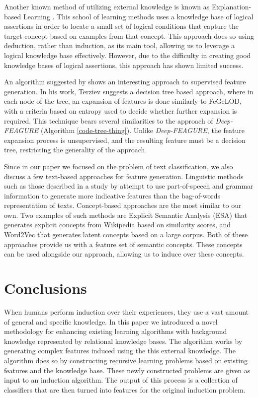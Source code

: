 \documentclass[twoside,11pt]{article}
\theoremstyle{definition}
\begin{document}
Another known method of utilizing external knowledge is known as Explanation-based Learning . This school of learning methods uses a knowledge base of logical assertions in order to locate a small set of logical conditions that capture the target concept based on examples from that concept. This approach does so using deduction, rather than induction, as its main tool, allowing us to leverage a logical knowledge base effectively.
However, due to the difficulty in creating good knowledge bases of logical assertions, this approach has shown limited success.

An algorithm suggested by  shows an interesting approach to supervised feature generation. In his work, Terziev suggests a decision tree based approach, where in each node of the tree, an expansion of features is done similarly to FeGeLOD, with a criteria based on entropy used to decide whether further expansion is required. This technique bears several similarities to the approach of \emph{Deep-FEAGURE} (Algorithm \ref{code-tree-thing}). Unlike \emph{Deep-FEAGURE}, the feature expansion process is unsupervised, and the resulting feature must be a decision tree, restricting the generality of the approach.

Since in our paper we focused on the problem of text classification, we also discuss a few text-based approaches for feature generation. 
Linguistic methods such as those described in a study by  attempt to use part-of-speech and grammar information to generate more indicative features than the bag-of-words representation of texts.
Concept-based approaches are the most similar to our own. Two examples of such methods are Explicit Semantic Analysis (ESA) \cite{gabrilovich2009wikipediafull} that generates explicit concepts from Wikipedia based on similarity scores, and Word2Vec  that generates latent concepts based on a large corpus. Both of these approaches provide us with a feature set of semantic concepts. These concepts can be used alongside our approach, allowing us to induce over these concepts.

\section{Conclusions}

When humans perform induction over their experiences, they use a vast amount of general and specific knowledge. In this paper we introduced a novel methodology for enhancing existing learning algorithms with background knowledge represented by relational knowledge bases.
The algorithm works by generating complex features induced using the this external knowledge. The algorithm does so by constructing recursive learning problems based on existing features and the knowledge base. These newly constructed problems are given as input to an induction algorithm. The output of this process is a collection of classifiers that are then turned into features for the original induction problem.
\end{document}
